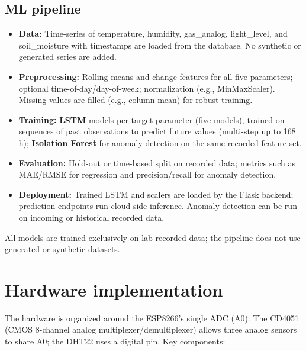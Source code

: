 \documentclass[journal,onecolumn]{IEEEtran}
\begin{document}
\subsection{ML pipeline}

\begin{itemize}
    \item \textbf{Data:} Time-series of temperature, humidity, gas\_analog, light\_level, and soil\_moisture with timestamps are loaded from the database. No synthetic or generated series are added.
    
    \item \textbf{Preprocessing:} Rolling means and change features for all five parameters; optional time-of-day/day-of-week; normalization (e.g., MinMaxScaler). Missing values are filled (e.g., column mean) for robust training.
    
    \item \textbf{Training:} \textbf{LSTM} models per target parameter (five models), trained on sequences of past observations to predict future values (multi-step up to 168\,h); \textbf{Isolation Forest} for anomaly detection on the same recorded feature set.
    \item \textbf{Evaluation:} Hold-out or time-based split on recorded data; metrics such as MAE/RMSE for regression and precision/recall for anomaly detection.
    
    \item \textbf{Deployment:} Trained LSTM and scalers are loaded by the Flask backend; prediction endpoints run cloud-side inference. Anomaly detection can be run on incoming or historical recorded data.
\end{itemize}

All models are trained exclusively on lab-recorded data; the pipeline does not use generated or synthetic datasets.

\section{Hardware implementation}
The hardware is organized around the ESP8266's single ADC (A0). The CD4051 (CMOS 8-channel analog multiplexer/demultiplexer) allows three analog sensors to share A0; the DHT22 uses a digital pin. Key components:
\end{document}
